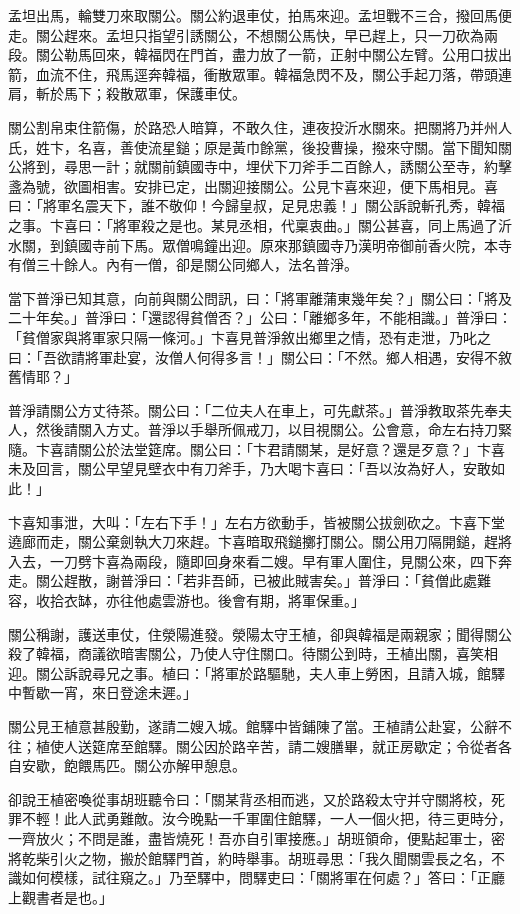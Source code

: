 孟坦出馬，輪雙刀來取關公。關公約退車仗，拍馬來迎。孟坦戰不三合，撥回馬便走。關公趕來。孟坦只指望引誘關公，不想關公馬快，早已趕上，只一刀砍為兩段。關公勒馬回來，韓福閃在門首，盡力放了一箭，正射中關公左臂。公用口拔出箭，血流不住，飛馬逕奔韓福，衝散眾軍。韓福急閃不及，關公手起刀落，帶頭連肩，斬於馬下；殺散眾軍，保護車仗。

關公割帛束住箭傷，於路恐人暗算，不敢久住，連夜投沂水關來。把關將乃并州人氏，姓卞，名喜，善使流星鎚；原是黃巾餘黨，後投曹操，撥來守關。當下聞知關公將到，尋思一計；就關前鎮國寺中，埋伏下刀斧手二百餘人，誘關公至寺，約擊盞為號，欲圖相害。安排已定，出關迎接關公。公見卞喜來迎，便下馬相見。喜曰：「將軍名震天下，誰不敬仰！今歸皇叔，足見忠義！」關公訴說斬孔秀，韓福之事。卞喜曰：「將軍殺之是也。某見丞相，代稟衷曲。」關公甚喜，同上馬過了沂水關，到鎮國寺前下馬。眾僧鳴鐘出迎。原來那鎮國寺乃漢明帝御前香火院，本寺有僧三十餘人。內有一僧，卻是關公同鄉人，法名普淨。

當下普淨已知其意，向前與關公問訊，曰：「將軍離蒲東幾年矣？」關公曰：「將及二十年矣。」普淨曰：「還認得貧僧否？」公曰：「離鄉多年，不能相識。」普淨曰：「貧僧家與將軍家只隔一條河。」卞喜見普淨敘出鄉里之情，恐有走泄，乃叱之曰：「吾欲請將軍赴宴，汝僧人何得多言！」關公曰：「不然。鄉人相遇，安得不敘舊情耶？」

普淨請關公方丈待茶。關公曰：「二位夫人在車上，可先獻茶。」普淨教取茶先奉夫人，然後請關入方丈。普淨以手舉所佩戒刀，以目視關公。公會意，命左右持刀緊隨。卞喜請關公於法堂筵席。關公曰：「卞君請關某，是好意？還是歹意？」卞喜未及回言，關公早望見壁衣中有刀斧手，乃大喝卞喜曰：「吾以汝為好人，安敢如此！」

卞喜知事泄，大叫：「左右下手！」左右方欲動手，皆被關公拔劍砍之。卞喜下堂遶廊而走，關公棄劍執大刀來趕。卞喜暗取飛鎚擲打關公。關公用刀隔開鎚，趕將入去，一刀劈卞喜為兩段，隨即回身來看二嫂。早有軍人圍住，見關公來，四下奔走。關公趕散，謝普淨曰：「若非吾師，已被此賊害矣。」普淨曰：「貧僧此處難容，收拾衣缽，亦往他處雲游也。後會有期，將軍保重。」

關公稱謝，護送車仗，住滎陽進發。滎陽太守王植，卻與韓福是兩親家；聞得關公殺了韓福，商議欲暗害關公，乃使人守住關口。待關公到時，王植出關，喜笑相迎。關公訴說尋兄之事。植曰：「將軍於路驅馳，夫人車上勞困，且請入城，館驛中暫歇一宵，來日登途未遲。」

關公見王植意甚殷勤，遂請二嫂入城。館驛中皆鋪陳了當。王植請公赴宴，公辭不往；植使人送筵席至館驛。關公因於路辛苦，請二嫂膳畢，就正房歇定；令從者各自安歇，飽餵馬匹。關公亦解甲憩息。

卻說王植密喚從事胡班聽令曰：「關某背丞相而逃，又於路殺太守并守關將校，死罪不輕！此人武勇難敵。汝今晚點一千軍圍住館驛，一人一個火把，待三更時分，一齊放火；不問是誰，盡皆燒死！吾亦自引軍接應。」胡班領命，便點起軍士，密將乾柴引火之物，搬於館驛門首，約時舉事。胡班尋思：「我久聞關雲長之名，不識如何模樣，試往窺之。」乃至驛中，問驛吏曰：「關將軍在何處？」答曰：「正廳上觀書者是也。」

